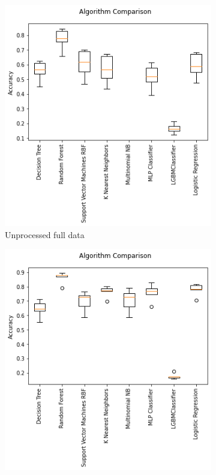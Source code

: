 \documentclass[a4paper,singleside,12pt]{report} %
\begin{document}
			\begin{figure}[!htb]
			  \centering
			  \begin{subfigure}[b]{0.48\linewidth}
			    \includegraphics[width=\linewidth]{./figures/results_model_comparison_unprocessed_full_data.png}
			     \caption{Unprocessed full data}
			  \end{subfigure}
			  \begin{subfigure}[b]{0.48\linewidth}
			    \includegraphics[width=\linewidth]{./figures/results_model_comparison_preprocessed_full_data_updated.png}

\end{subfigure}
\end{figure}
\end{document}
